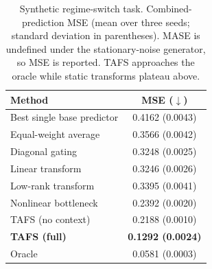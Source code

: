 \begin{table}[t]
\centering
\caption{Synthetic regime-switch task. Combined-prediction MSE (mean over three seeds; standard deviation in parentheses). MASE is undefined under the stationary-noise generator, so MSE is reported. TAFS approaches the oracle while static transforms plateau above.}
\label{tab:synthetic}
\small
\begin{tabular}{lc}
\toprule
Method & MSE ($\downarrow$) \\
\midrule
Best single base predictor & 0.4162 \scriptsize{(0.0043)} \\
Equal-weight average & 0.3566 \scriptsize{(0.0042)} \\
Diagonal gating & 0.3248 \scriptsize{(0.0025)} \\
Linear transform & 0.3246 \scriptsize{(0.0026)} \\
Low-rank transform & 0.3395 \scriptsize{(0.0041)} \\
Nonlinear bottleneck & 0.2392 \scriptsize{(0.0020)} \\
TAFS (no context) & 0.2188 \scriptsize{(0.0010)} \\
\textbf{TAFS (full)} & \textbf{0.1292 \scriptsize{(0.0024)}} \\
\midrule
Oracle & 0.0581 \scriptsize{(0.0003)} \\
\bottomrule
\end{tabular}
\end{table}
